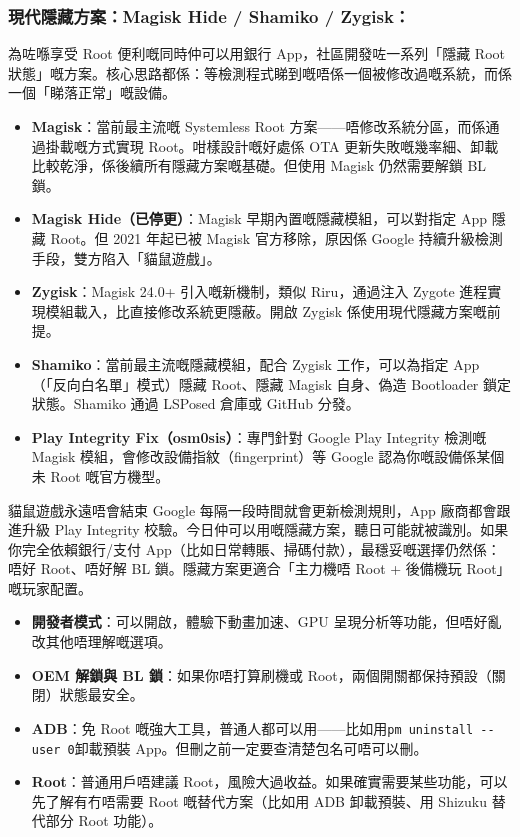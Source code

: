 \subsubsection*{現代隱藏方案：Magisk Hide / Shamiko / Zygisk：}

為咗喺享受 Root 便利嘅同時仲可以用銀行 App，社區開發咗一系列「隱藏 Root 狀態」嘅方案。核心思路都係：等檢測程式睇到嘅唔係一個被修改過嘅系統，而係一個「睇落正常」嘅設備。

\begin{itemize}
  \item \textbf{Magisk}：當前最主流嘅 Systemless Root 方案——唔修改系統分區，而係通過掛載嘅方式實現 Root。咁樣設計嘅好處係 OTA 更新失敗嘅幾率細、卸載比較乾淨，係後續所有隱藏方案嘅基礎。但使用 Magisk 仍然需要解鎖 BL 鎖。
  \item \textbf{Magisk Hide（已停更）}：Magisk 早期內置嘅隱藏模組，可以對指定 App 隱藏 Root。但 2021 年起已被 Magisk 官方移除，原因係 Google 持續升級檢測手段，雙方陷入「貓鼠遊戲」。
  \item \textbf{Zygisk}：Magisk 24.0+ 引入嘅新機制，類似 Riru，通過注入 Zygote 進程實現模組載入，比直接修改系統更隱蔽。開啟 Zygisk 係使用現代隱藏方案嘅前提。
  \item \textbf{Shamiko}：當前最主流嘅隱藏模組，配合 Zygisk 工作，可以為指定 App（「反向白名單」模式）隱藏 Root、隱藏 Magisk 自身、偽造 Bootloader 鎖定狀態。Shamiko 通過 LSPosed 倉庫或 GitHub 分發。
  \item \textbf{Play Integrity Fix（osm0sis）}：專門針對 Google Play Integrity 檢測嘅 Magisk 模組，會修改設備指紋（fingerprint）等 Google 認為你嘅設備係某個未 Root 嘅官方機型。
\end{itemize}

\begin{tcbwarn}{貓鼠遊戲永遠唔會結束}
Google 每隔一段時間就會更新檢測規則，App 廠商都會跟進升級 Play Integrity 校驗。今日仲可以用嘅隱藏方案，聽日可能就被識別。如果你完全依賴銀行/支付 App（比如日常轉賬、掃碼付款），最穩妥嘅選擇仍然係：唔好 Root、唔好解 BL 鎖。隱藏方案更適合「主力機唔 Root + 後備機玩 Root」嘅玩家配置。

\end{tcbwarn}


\begin{itemize}
  \item \textbf{開發者模式}：可以開啟，體驗下動畫加速、GPU 呈現分析等功能，但唔好亂改其他唔理解嘅選項。
  \item \textbf{OEM 解鎖與 BL 鎖}：如果你唔打算刷機或 Root，兩個開關都保持預設（關閉）狀態最安全。
  \item \textbf{ADB}：免 Root 嘅強大工具，普通人都可以用——比如用\texttt{pm uninstall -\allowbreak -\allowbreak user 0}卸載預裝 App。但刪之前一定要查清楚包名可唔可以刪。
  \item \textbf{Root}：普通用戶唔建議 Root，風險大過收益。如果確實需要某些功能，可以先了解有冇唔需要 Root 嘅替代方案（比如用 ADB 卸載預裝、用 Shizuku 替代部分 Root 功能）。
\end{itemize}


